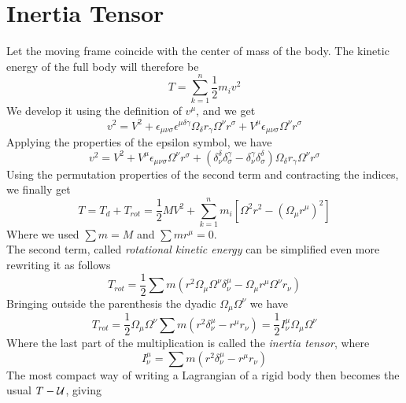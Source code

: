 \documentclass[../admech.tex]{subfiles}
\begin{document}
\section{Inertia Tensor}
Let the moving frame coincide with the center of mass of the body. The kinetic energy of the full body will therefore be
\begin{equation}
	T=\sum_{k=1}^n\frac{1}{2}m_iv^2
	\label{eq:kinensolid}
\end{equation}
We develop it using the definition of $v^\mu$, and we get
\begin{equation*}
	v^2=V^2+\epsilon_{\mu\nu\sigma}\epsilon^{\mu\delta\gamma}\Omega_\delta r_\gamma\Omega^\nu r^\sigma+V^\mu\epsilon_{\mu\nu\sigma}\Omega^\nu r^\sigma
\end{equation*}
Applying the properties of the epsilon symbol, we have
\begin{equation*}
	v^2=V^2+V^\mu\epsilon_{\mu\nu\sigma}\Omega^\nu r^\sigma+\left( \delta^\delta_\nu\delta^\gamma_\sigma-\delta^\gamma_\nu\delta^\delta_\sigma \right)\Omega_\delta r_\gamma\Omega^\nu r^\sigma
\end{equation*}
Using the permutation properties of the second term and contracting the indices, we finally get
\begin{equation}
	T=T_d+T_{rot}=\frac{1}{2}MV^2+\sum_{k=1}^nm_i\left[ \Omega^2r^2-(\Omega_\mu r^\mu)^2 \right]
	\label{eq:Tsolid}
\end{equation}
Where we used $\sum m=M$ and $\sum mr^\mu=0$.\\
The second term, called \emph{rotational kinetic energy} can be simplified even more rewriting it as follows
\begin{equation*}
	T_{rot}=\frac{1}{2}\sum m\left( r^2\Omega_\mu\Omega^\nu\delta^\mu_\nu-\Omega_\mu r^\mu\Omega^\nu r_\nu \right)
\end{equation*}
Bringing outside the parenthesis the dyadic $\Omega_\mu\Omega^\nu$ we have
\begin{equation}
	T_{rot}=\frac{1}{2}\Omega_\mu\Omega^\nu\sum m\left( r^2\delta^\mu_\nu-r^\mu r_\nu \right)=\frac{1}{2}I^\mu_\nu\Omega_\mu\Omega^\nu
	\label{eq:inertiatensor}
\end{equation}
Where the last part of the multiplication is called the \emph{inertia tensor}, where
\begin{equation}
	I^\mu_\nu=\sum m \left( r^2\delta^\mu_\nu-r^\mu r_\nu \right)
	\label{eq:inertiatensorcomp}
\end{equation}
The most compact way of writing a Lagrangian of a rigid body then becomes the usual $T-\mathcal{U}$, giving
\end{document}

